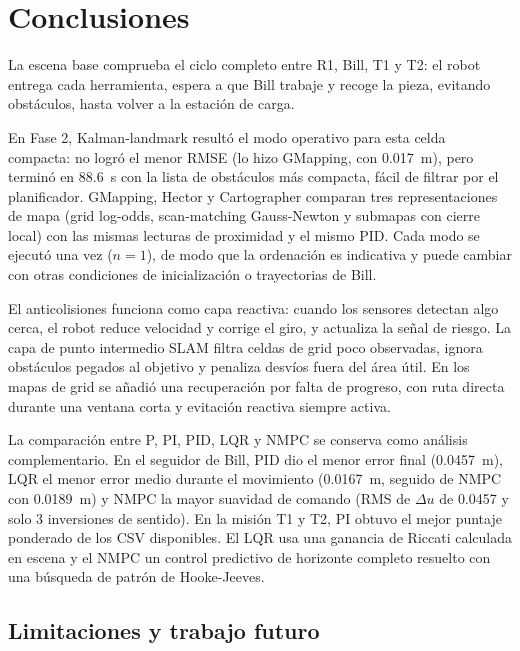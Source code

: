 \chapter*{Conclusiones}

La escena base comprueba el ciclo completo entre R1, Bill, T1 y T2: el robot
entrega cada herramienta, espera a que Bill trabaje y recoge la pieza, evitando
obstáculos, hasta volver a la estación de carga.

En Fase 2, Kalman-landmark resultó el modo operativo para esta celda compacta:
no logró el menor RMSE (lo hizo GMapping, con \SI{0.017}{m}), pero terminó en
\SI{88.6}{s} con la lista de obstáculos más compacta, fácil de filtrar por el
planificador. GMapping, Hector y Cartographer comparan tres representaciones de
mapa (grid log-odds, scan-matching Gauss-Newton y submapas con cierre local) con
las mismas lecturas de proximidad y el mismo PID. Cada modo se ejecutó una vez
(\(n=1\)), de modo que la ordenación es indicativa y puede cambiar con otras
condiciones de inicialización o trayectorias de Bill.

El anticolisiones funciona como capa reactiva: cuando los sensores detectan algo
cerca, el robot reduce velocidad y corrige el giro, y actualiza la señal de riesgo. La capa de
punto intermedio SLAM filtra celdas de grid poco observadas, ignora obstáculos
pegados al objetivo y penaliza desvíos fuera del área útil. En los mapas de grid
se añadió una recuperación por falta de progreso, con ruta directa durante una
ventana corta y evitación reactiva siempre activa.

La comparación entre P, PI, PID, LQR y NMPC se conserva como análisis complementario. En el
seguidor de Bill, PID dio el menor error final (\SI{0.0457}{m}), LQR el menor
error medio durante el movimiento (\SI{0.0167}{m}, seguido de NMPC con
\SI{0.0189}{m}) y NMPC la mayor suavidad de comando (RMS de \(\Delta u\) de
\num{0.0457} y solo 3 inversiones de sentido). En la misión T1 y T2, PI obtuvo el
mejor puntaje ponderado de los CSV disponibles. El LQR usa una ganancia de
Riccati calculada en escena y el NMPC un control predictivo de horizonte
completo resuelto con una búsqueda de patrón de Hooke-Jeeves.

\section*{Limitaciones y trabajo futuro}

